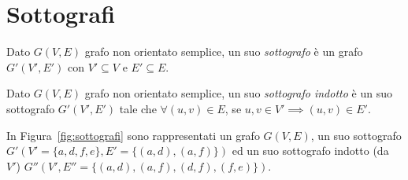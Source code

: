 \section{Sottografi}
\begin{defn}[sottografo]
Dato  $G(V,E)$ grafo non orientato semplice, un suo \emph{sottografo} è un grafo
$G'(V',E')$ con $V' \subseteq V$ e $E' \subseteq E$.
\end{defn}

\begin{defn}
Dato  $G(V,E)$ grafo non orientato semplice, un suo \emph{sottografo indotto} è un 
suo sottografo ${G'(V',E')}$ tale che ${\forall (u,v) \in E}$, se
${u,v \in V' \implies (u,v) \in E'}$.
\end{defn}

\begin{ese}
In Figura~\ref{fig:sottografi} sono rappresentati un grafo ${G(V,E)}$, un suo sottografo
${G'(V' = \{a,d,f,e\}, E'= \{ (a,d), (a,f) \})}$ ed un suo sottografo indotto (da~$V'$)
${G''(V', E''= \{ (a,d), (a,f), (d,f), (f,e) \})}$.
\begin{figure}[H]
    \centering
\end{figure}
\end{ese}
